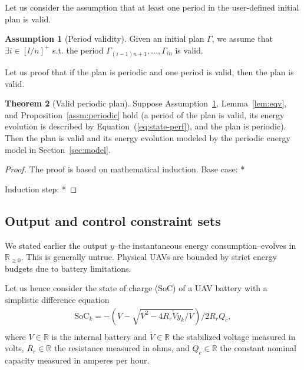 \documentclass[letterpaper,10pt,conference]{ieeeconf}
\theoremstyle{definition}
\newtheorem{thm}{Theorem}[section]
\newtheorem{assm}[thm]{Assumption}
\begin{document}
Let us consider the assumption that at least one period in the user-defined initial plan is valid.

\begin{assm}[Period validity]\label{assm:valid}
  Given an initial plan $\Gamma$, we assume that $\exists i\in[l/n]^+$ s.t. the period $\Gamma_{(i-1)n+1},\dots,\Gamma_{in}$ is valid.
\end{assm}

Let us proof that if the plan is periodic and one period is valid, then the plan is valid.

\begin{thm}[Valid periodic plan]\label{thm:state-vs-energy}  
  Suppose Assumption~\ref{assm:valid}, Lemma~\ref{lem:eqv}, and Proposition~\ref{assm:periodic} hold (a period of the plan is valid, its energy evolution is described by Equation~(\ref{eq:state-perf}), and the plan is periodic). Then the plan is valid and its energy evolution modeled by the periodic energy model in Section~\ref{sec:model}.
\end{thm}
\begin{proof}
  The proof is based on mathematical induction. 
  Base case: * 
  
  Induction step: * 

\end{proof}

\subsection{Output and control constraint sets}

We stated earlier the output $y$--the instantaneous energy consumption--evolves in $\mathbb{R}_{\geq 0}$. This is generally untrue. Physical UAVs are bounded by strict energy budgets due to battery limitations.

Let us hence consider the state of charge (SoC) of a UAV battery with a simplistic difference equation~\cite{seewald2020mechanical}
\begin{equation}\label{eq:soc}\begin{split}
  \mathrm{SoC}_k=-\left(V-
  \sqrt{
    V^2-
    4R_r\tilde{V}y_k/V}
  \right)/2R_rQ_c,\\ 
\end{split}\end{equation}
where $V\in\mathbb{R}$ is the internal battery and $\tilde{V}\in\mathbb{R}$ the stabilized voltage measured in volts, $R_r\in\mathbb{R}$ the resistance measured in ohms, and $Q_c\in\mathbb{R}$ the constant nominal capacity measured in amperes per hour. 
\end{document}
